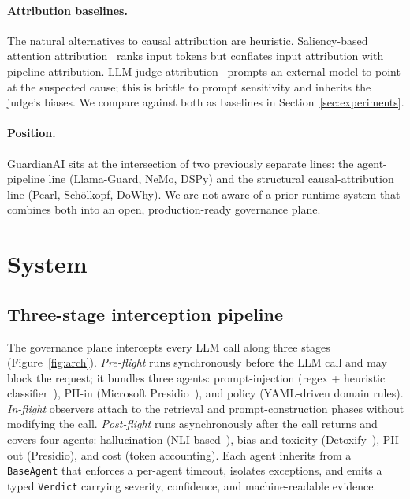 \documentclass[11pt,letterpaper]{article}
\begin{document}
\paragraph{Attribution baselines.}
The natural alternatives to causal attribution are heuristic.
Saliency-based attention attribution~\cite{simonyan2014saliency,abnar2020attention}
ranks input tokens but conflates input attribution with pipeline
attribution.  LLM-judge attribution~\cite{zheng2023llmjudge} prompts
an external model to point at the suspected cause; this is brittle to
prompt sensitivity and inherits the judge's biases.  We compare
against both as baselines in Section~\ref{sec:experiments}.

\paragraph{Position.}
GuardianAI sits at the intersection of two previously separate lines:
the agent-pipeline line (Llama-Guard, NeMo, DSPy) and the structural
causal-attribution line (Pearl, Sch\"olkopf, DoWhy).  We are not aware
of a prior runtime system that combines both into an open,
production-ready governance plane.

\section{System}
\label{sec:system}

\subsection{Three-stage interception pipeline}
\label{sec:pipeline}

The governance plane intercepts every LLM call along three stages
(Figure~\ref{fig:arch}).  \emph{Pre-flight} runs synchronously before
the LLM call and may block the request; it bundles three agents:
prompt-injection (regex + heuristic
classifier~\cite{lakera2023gandalf,zou2023advbench}),
PII-in (Microsoft Presidio~\cite{microsoft2021presidio}), and policy
(YAML-driven domain rules).  \emph{In-flight} observers attach to the
retrieval and prompt-construction phases without modifying the call.
\emph{Post-flight} runs asynchronously after the call returns and
covers four agents: hallucination
(NLI-based~\cite{liu2019roberta,williams2018mnli}), bias and toxicity
(Detoxify~\cite{hanu2020detoxify}), PII-out (Presidio), and cost (token
accounting).  Each agent inherits from a \texttt{BaseAgent} that
enforces a per-agent timeout, isolates exceptions, and emits a typed
\texttt{Verdict} carrying severity, confidence, and machine-readable
evidence.
\end{document}
